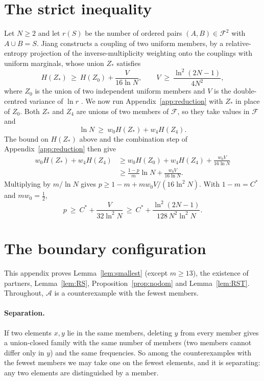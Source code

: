\documentclass[aps,prd,twocolumn,superscriptaddress,nofootinbib,longbibliography,floatfix,amsmath,amssymb,10pt]{revtex4-2}
\theoremstyle{plain}
\theoremstyle{definition}
\theoremstyle{plain}
\newcommand{\cF}{\mathcal{F}}
\newcommand{\cA}{\mathcal{A}}
\newcommand{\Cs}{C^{*}}
\begin{document}
\section{The strict inequality}\label{app:strict}

Let $N\ge2$ and let $r(S)$ be the number of ordered pairs $(A,B)\in\cF^2$ with $A\cup B=S$. Jiang \cite[Section~10]{Jia26} constructs a coupling of two uniform members, by a relative-entropy projection of the inverse-multiplicity weighting onto the couplings with uniform marginals, whose union $Z_*$ satisfies
\[
H(Z_*)\ \ge\ H(Z_0)+\frac{V}{16\ln N},\qquad V\ \ge\ \frac{\ln^2(2N-1)}{4N^2},
\]
where $Z_0$ is the union of two independent uniform members and $V$ is the double-centred variance of $\ln r$ \cite[Theorem~10.2]{Jia26}. We now run Appendix~\ref{app:reduction} with $Z_*$ in place of $Z_0$. Both $Z_*$ and $Z_4$ are unions of two members of $\cF$, so they take values in $\cF$ and
\[
\ln N\ \ge\ w_0H(Z_*)+w_4H(Z_4).
\]
The bound on $H(Z_*)$ above and the combination step of Appendix~\ref{app:reduction} then give
\begin{align*}
w_0H(Z_*)+w_4H(Z_4)&\ge w_0H(Z_0)+w_4H(Z_4)+\frac{w_0V}{16\ln N}\\
&\ge \frac{1-p}{m}\ln N+\frac{w_0V}{16\ln N}.
\end{align*}
Multiplying by $m/\ln N$ gives $p\ge 1-m+mw_0V/(16\ln^2N)$. With $1-m=\Cs$ and $mw_0=\frac12$,
\[
p\ \ge\ \Cs+\frac{V}{32\ln^2N}\ \ge\ \Cs+\frac{\ln^2(2N-1)}{128\,N^2\ln^2 N}.
\]

\section{The boundary configuration}\label{app:boundary}

This appendix proves Lemma~\ref{lem:smallest} (except $m\ge13$), the existence of partners, Lemma~\ref{lem:RS}, Proposition~\ref{prop:nodom} and Lemma~\ref{lem:RST}. Throughout, $\cA$ is a counterexample with the fewest members.

\paragraph*{Separation.} If two elements $x,y$ lie in the same members, deleting $y$ from every member gives a union-closed family with the same number of members (two members cannot differ only in $y$) and the same frequencies. So among the counterexamples with the fewest members we may take one on the fewest elements, and it is separating: any two elements are distinguished by a member.
\end{document}
